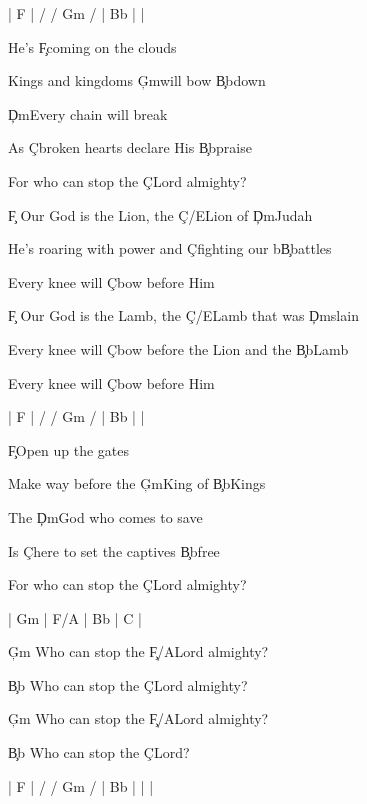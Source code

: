 \documentclass[9pt]{extarticle}
\begin{document}
\bsong

\bi[2]
| F |  / / Gm /  | Bb |  |
\ei

\bv
He's \c{F}coming on the clouds

Kings and kingdoms \c{Gm}will bow \c{Bb}down

\c{Dm}Every chain will break

As \c{C}broken hearts declare His \c{Bb}praise

For who can stop the \c{C}Lord almighty?
\ev

\bc
\c{F} Our God is the Lion, the \c{C/E}Lion of \c{Dm}Judah

He’s roaring with power and \c{C}fighting our b\c{Bb}attles

Every knee will \c{C}bow before Him



\c{F} Our God is the Lamb, the \c{C/E}Lamb that was \c{Dm}slain


Every knee will \c{C}bow before the Lion and the \c{Bb}Lamb

Every knee will \c{C}bow before Him
\ec

\bin[2]
| F |  / / Gm /  | Bb |  |
\ein

\bv
\c{F}Open up the gates

Make way before the \c{Gm}King of \c{Bb}Kings

The \c{Dm}God who comes to save

Is \c{C}here to set the captives \c{Bb}free

For who can stop the \c{C}Lord almighty?
\ev


\bin
| Gm |  F/A  | Bb | C |
\ein

\bb[3]
\c{Gm} Who can stop the \c{F/A}Lord almighty?

\c{Bb} Who can stop the \c{C}Lord almighty?
\eb

\bb
\c{Gm} Who can stop the \c{F/A}Lord almighty?

\c{Bb} Who can stop the \c{C}Lord?
\eb


\bo[2]
| F |  / / Gm /  | Bb |  |  |
\eo

\esong
\end{document}
